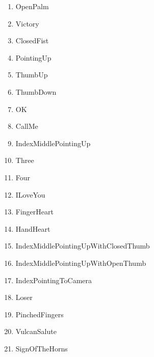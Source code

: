 \documentclass[10pt,twocolumn,letterpaper]{article}
\begin{document}
\vspace{\topsep}
\begin{enumerate}
\setlength{\parskip}{0pt}
\setlength{\itemsep}{0pt plus 3pt}
  \item OpenPalm
  \item Victory
  \item ClosedFist
  \item PointingUp
  \item ThumbUp
  \item ThumbDown
  \item OK
  \item CallMe
  \item IndexMiddlePointingUp
  \item Three
  \item Four
  \item ILoveYou
  \item FingerHeart
  \item HandHeart
  \item IndexMiddlePointingUpWithClosedThumb
  \item IndexMiddlePointingUpWithOpenThumb
  \item IndexPointingToCamera
  \item Loser
  \item PinchedFingers
  \item VulcanSalute
  \item SignOfTheHorns
\end{enumerate}
\end{document}
